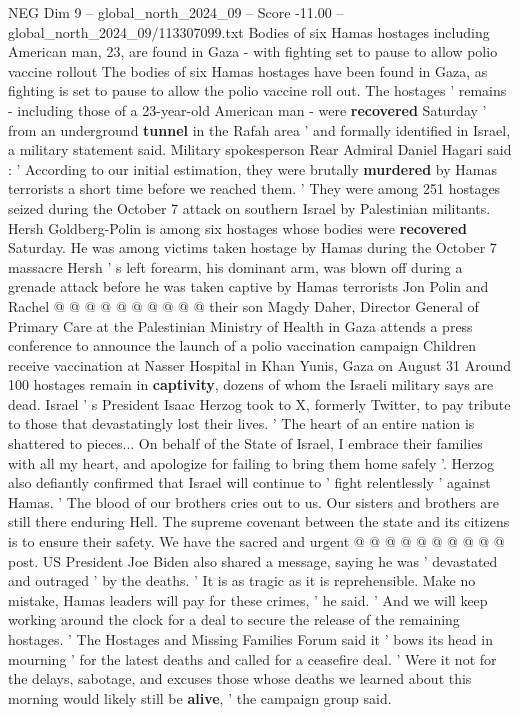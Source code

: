 \begin{textsample}{NEG Dim 9 – global\_north\_2024\_09 – Score -11.00 – global\_north\_2024\_09/113307099.txt}  \label{ex:f9_neg_008}
Bodies of six Hamas hostages including American man, 23, are found in Gaza - with fighting set to pause to allow polio vaccine rollout The bodies of six Hamas hostages have been found in Gaza, as fighting is set to pause to allow the polio vaccine roll out.
The hostages ' remains - including those of a 23-year-old American man - were \textbf{recovered} Saturday ' from an underground \textbf{tunnel} in the Rafah area ' and formally identified in Israel, a military statement said.
Military spokesperson Rear Admiral Daniel Hagari said : ' According to our initial estimation, they were brutally \textbf{murdered} by Hamas terrorists a short time before we reached them. ' They were among 251 hostages seized during the October 7 attack on southern Israel by Palestinian militants.
Hersh Goldberg-Polin is among six hostages whose bodies were \textbf{recovered} Saturday.
He was among victims taken hostage by Hamas during the October 7 massacre Hersh ' s left forearm, his dominant arm, was blown off during a grenade attack before he was taken captive by Hamas terrorists Jon Polin and Rachel @ @ @ @ @ @ @ @ @ @ their son Magdy Daher, Director General of Primary Care at the Palestinian Ministry of Health in Gaza attends a press conference to announce the launch of a polio vaccination campaign Children receive vaccination at Nasser Hospital in Khan Yunis, Gaza on August 31 Around 100 hostages remain in \textbf{captivity}, dozens of whom the Israeli military says are dead.
Israel ' s President Isaac Herzog took to X, formerly Twitter, to pay tribute to those that devastatingly lost their lives. ' The heart of an entire nation is shattered to pieces...
On behalf of the State of Israel, I embrace their families with all my heart, and apologize for failing to bring them home safely '.
Herzog also defiantly confirmed that Israel will continue to ' fight relentlessly ' against Hamas. ' The blood of our brothers cries out to us.
Our sisters and brothers are still there enduring Hell.
The supreme covenant between the state and its citizens is to ensure their safety.
We have the sacred and urgent @ @ @ @ @ @ @ @ @ @ post.
US President Joe Biden also shared a message, saying he was ' devastated and outraged ' by the deaths. ' It is as tragic as it is reprehensible.
Make no mistake, Hamas leaders will pay for these crimes, ' he said. ' And we will keep working around the clock for a deal to secure the release of the remaining hostages. ' The Hostages and Missing Families Forum said it ' bows its head in mourning ' for the latest deaths and called for a ceasefire deal. ' Were it not for the delays, sabotage, and excuses those whose deaths we learned about this morning would likely still be \textbf{alive}, ' the campaign group said.

\end{textsample}

